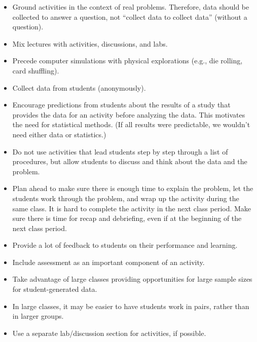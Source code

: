 \vspace{.2in}
\noindent {}
\begin{itemize}[leftmargin=1cm, itemsep=.2em]
\item Ground activities in the context of real problems. Therefore, data should be collected to answer a question, not ``collect data to collect data'' (without a question).
\item Mix lectures with activities, discussions, and labs.
\item Precede computer simulations with physical explorations (e.g., die rolling, card shuffling).
\item Collect data from students (anonymously).
\item Encourage predictions from students about the results of a study that provides the data for an activity before analyzing the data. This motivates the need for statistical methods. (If all results were predictable, we wouldn't need either data or statistics.)
\item Do not use activities that lead students step by step through a list of procedures, but allow students to discuss and think about the data and the problem.  
\item Plan ahead to make sure there is enough time to explain the problem, let the students work through the problem, and wrap up the activity during the same class. It is hard to complete the activity in the next class period. Make sure there is time for recap and debriefing, even if at the beginning of the next class period.
\item Provide a lot of feedback to students on their performance and learning.
\item Include assessment as an important component of an activity.
\end{itemize}
 
\vspace{.2in}
\noindent {}
\begin{itemize}[leftmargin=1cm, itemsep=.2em]
\item Take advantage of large classes providing opportunities for large sample sizes for student-generated data.
\item In large classes, it may be easier to have students work in pairs, rather than in larger groups.
\item Use a separate lab/discussion section for activities, if possible.
\end{itemize}

